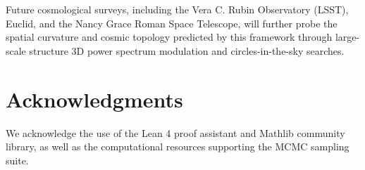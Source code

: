 \documentclass[11pt,a4paper]{article}
\theoremstyle{definition}
\begin{document}
Future cosmological surveys, including the Vera C. Rubin Observatory (LSST), Euclid, and the Nancy Grace Roman Space Telescope, will further probe the spatial curvature and cosmic topology predicted by this framework through large-scale structure 3D power spectrum modulation and circles-in-the-sky searches.

\section*{Acknowledgments}
We acknowledge the use of the Lean 4 proof assistant and Mathlib community library, as well as the computational resources supporting the MCMC sampling suite.



\end{document}
